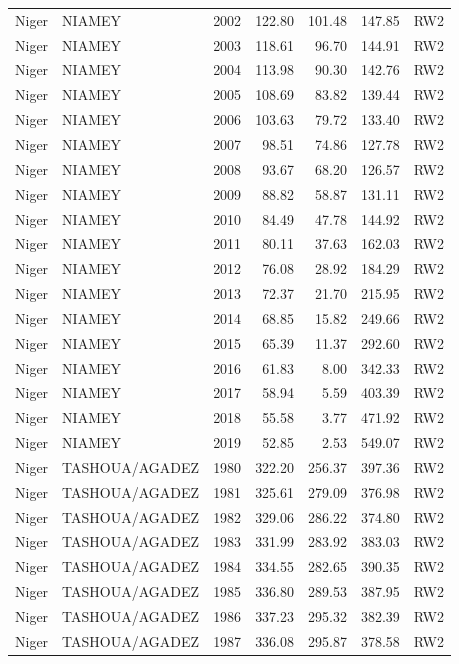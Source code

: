 \begin{longtable}{lllrrrl}
  Niger & NIAMEY & 2002 & 122.80 & 101.48 & 147.85 & RW2 \\ 
  Niger & NIAMEY & 2003 & 118.61 & 96.70 & 144.91 & RW2 \\ 
  Niger & NIAMEY & 2004 & 113.98 & 90.30 & 142.76 & RW2 \\ 
  Niger & NIAMEY & 2005 & 108.69 & 83.82 & 139.44 & RW2 \\ 
  Niger & NIAMEY & 2006 & 103.63 & 79.72 & 133.40 & RW2 \\ 
  Niger & NIAMEY & 2007 & 98.51 & 74.86 & 127.78 & RW2 \\ 
  Niger & NIAMEY & 2008 & 93.67 & 68.20 & 126.57 & RW2 \\ 
  Niger & NIAMEY & 2009 & 88.82 & 58.87 & 131.11 & RW2 \\ 
  Niger & NIAMEY & 2010 & 84.49 & 47.78 & 144.92 & RW2 \\ 
  Niger & NIAMEY & 2011 & 80.11 & 37.63 & 162.03 & RW2 \\ 
  Niger & NIAMEY & 2012 & 76.08 & 28.92 & 184.29 & RW2 \\ 
  Niger & NIAMEY & 2013 & 72.37 & 21.70 & 215.95 & RW2 \\ 
  Niger & NIAMEY & 2014 & 68.85 & 15.82 & 249.66 & RW2 \\ 
  Niger & NIAMEY & 2015 & 65.39 & 11.37 & 292.60 & RW2 \\ 
  Niger & NIAMEY & 2016 & 61.83 & 8.00 & 342.33 & RW2 \\ 
  Niger & NIAMEY & 2017 & 58.94 & 5.59 & 403.39 & RW2 \\ 
  Niger & NIAMEY & 2018 & 55.58 & 3.77 & 471.92 & RW2 \\ 
  Niger & NIAMEY & 2019 & 52.85 & 2.53 & 549.07 & RW2 \\ 
  Niger & TASHOUA/AGADEZ & 1980 & 322.20 & 256.37 & 397.36 & RW2 \\ 
  Niger & TASHOUA/AGADEZ & 1981 & 325.61 & 279.09 & 376.98 & RW2 \\ 
  Niger & TASHOUA/AGADEZ & 1982 & 329.06 & 286.22 & 374.80 & RW2 \\ 
  Niger & TASHOUA/AGADEZ & 1983 & 331.99 & 283.92 & 383.03 & RW2 \\ 
  Niger & TASHOUA/AGADEZ & 1984 & 334.55 & 282.65 & 390.35 & RW2 \\ 
  Niger & TASHOUA/AGADEZ & 1985 & 336.80 & 289.53 & 387.95 & RW2 \\ 
  Niger & TASHOUA/AGADEZ & 1986 & 337.23 & 295.32 & 382.39 & RW2 \\ 
  Niger & TASHOUA/AGADEZ & 1987 & 336.08 & 295.87 & 378.58 & RW2 \\ 

\end{longtable}
